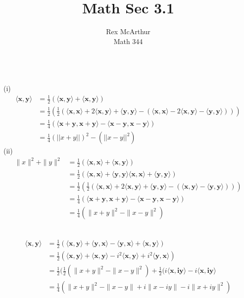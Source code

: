 \documentclass[letterpaper,12pt]{article}
\title{Math Sec 3.1}
\author{Rex McArthur\\Math 344}
\theoremstyle{definition}
\begin{document}
\maketitle
{}\\
(i)
\begin{align*}
    \langle \mathbf{x},\mathbf{y} \rangle & = \frac{1}{2} (\langle \mathbf{x},\mathbf{y} \rangle + \langle \mathbf{x},\mathbf{y} \rangle ) \\
    & = \frac{1}{2}(\frac{1}{2}(\langle \mathbf{x},\mathbf{x} \rangle + 2 \langle \mathbf{x},\mathbf{y} \rangle + \langle \mathbf{y},\mathbf{y} \rangle -( \langle \mathbf{x},\mathbf{x} \rangle  - 2 \langle \mathbf{x},\mathbf{y} \rangle -\langle \mathbf{y},\mathbf{y} \rangle ))) \\
    & = \frac{1}{4}( \langle \mathbf{x+y},\mathbf{x+y} \rangle - \langle \mathbf{x-y},\mathbf{x-y} \rangle ) \\
    & = \frac{1}{4} (||x + y||)^2 - (||x-y||^2)
\end{align*}
(ii)
\begin{align*}
    \|x\|^2 + \|y\|^2  &= \frac{1}{2}(\langle \mathbf{x},\mathbf{x} \rangle + \langle \mathbf{x},\mathbf{y} \rangle )     \\
    & = \frac{1}{2}(\langle \mathbf{x},\mathbf{x} \rangle + \langle \mathbf{y},\mathbf{y} \rangle \langle \mathbf{x},\mathbf{x} \rangle + \langle \mathbf{y},\mathbf{y} \rangle )\\
    & = \frac{1}{2}(\frac{1}{2}(\langle \mathbf{x},\mathbf{x} \rangle + 2 \langle \mathbf{x},\mathbf{y} \rangle + \langle \mathbf{y},\mathbf{y} \rangle - (\langle \mathbf{x},\mathbf{y} \rangle - \langle \mathbf{y},\mathbf{y} \rangle )))\\
    & = \frac{1}{4}(\langle \mathbf{x+y},\mathbf{x+y} \rangle - \langle \mathbf{x-y},\mathbf{x-y} \rangle ) \\
    & = \frac{1}{4}(\| x+y\|^2 - \|x-y\|^2)
\end{align*}

\\
\begin{align*}
    \langle \mathbf{x},\mathbf{y} \rangle & = \frac{1}{2}(\langle \mathbf{x},\mathbf{y} \rangle + \langle \mathbf{y},\mathbf{x} \rangle - \langle \mathbf{y},\mathbf{x} \rangle + \langle \mathbf{x},\mathbf{y} \rangle ) \\
    & = \frac{1}{2}(\langle \mathbf{x}, \mathbf{y} \rangle  + \langle \mathbf{x}, \mathbf{y} \rangle -i^2 \langle \mathbf{x}, \mathbf{y} \rangle  + i^2 \langle \mathbf{y}, \mathbf{x} \rangle ) \\
    & = \frac{1}{2}(\frac{1}{2}(\| x+y \| ^2 - \| x-y\|^2) + \frac{1}{2}(i \langle \mathbf{x}, \mathbf{iy} \rangle - i \langle \mathbf{x}, \mathbf{iy} \rangle \\
    & = \frac{1}{4} (\|x+y\|^2 - \|x-y \| + i\|x-iy\| - i \|x+iy\|^2)
\end{align*}
\end{document}
